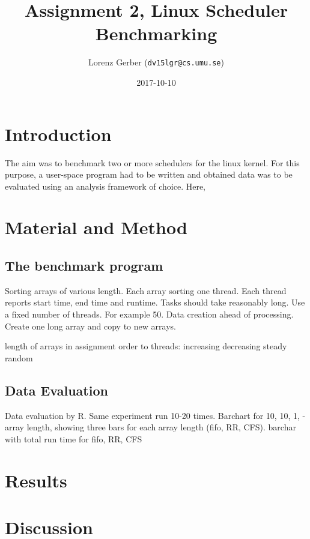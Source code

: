 \documentclass[a4paper,11pt,twoside]{article}
\title{Assignment 2, Linux Scheduler Benchmarking}
\author{Lorenz Gerber ({\tt{dv15lgr@cs.umu.se}})}
\date{2017-10-10}
\begin{document}
\lstset{language=C}
\maketitle
\thispagestyle{empty}
\newpage
\tableofcontents
\thispagestyle{empty}
\newpage

\clearpage
{}

\section{Introduction}
The aim was to benchmark two or more schedulers for the linux kernel.
For this purpose, a user-space program had to be written and obtained
data was to be evaluated using an analysis framework of choice.
Here,

\section{Material and Method}
\subsection{The benchmark program}
Sorting arrays of various length. Each array sorting one thread. Each thread
reports start time, end time and runtime. Tasks should take reasonably long.
Use a fixed number of threads. For example 50. Data creation ahead of
processing. Create one long array and copy to new arrays.

length of arrays in assignment order to threads:
increasing
decreasing
steady
random



\subsection{Data Evaluation}
Data evaluation by R. Same experiment run 10-20 times.
Barchart for 10, 10, 1, - array length, showing three bars for each array length (fifo, RR, CFS).
barchar with total run time for fifo, RR, CFS



\section{Results}


\section{Discussion}


%
\end{document}
